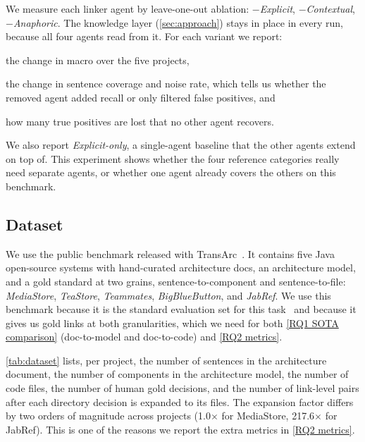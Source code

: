We measure each linker agent by leave-one-out ablation: \emph{$-$Explicit},
\emph{$-$Contextual}, \emph{$-$Anaphoric}. 
The knowledge layer (\autoref{sec:approach}) stays in place in every run, because all four
agents read from it. 
For each variant we report:
\begin{enumerate*}[label=(\roman*)] \item the change in macro \fone over the
five projects, \item the change in sentence coverage and noise rate, which tells
us whether the removed agent added recall or only filtered false positives, and
\item how many true positives are lost that no other agent recovers.
\end{enumerate*} We also report \emph{Explicit-only}, a single-agent baseline
that the other agents extend on top of. This experiment shows whether the four
reference categories really need separate agents, or whether one agent already
covers the others on this benchmark.

\subsection{Dataset}
\label{sec:dataset}

We use the public benchmark released with TransArc~\cite{transarc,replication}.
It contains five Java open-source systems with hand-curated architecture docs, an architecture model, and a gold standard at two grains, sentence-to-component and sentence-to-file:
\emph{MediaStore}, \emph{TeaStore}, \emph{Teammates}, \emph{BigBlueButton}, and \emph{JabRef}.
We use this benchmark because it is the standard evaluation set for this task~\cite{transarc,lissa} and because it gives us gold links at both granularities, which we need for both \ref{RQ1 SOTA comparison} (doc-to-model and doc-to-code) and \ref{RQ2 metrics}.



\autoref{tab:dataset} lists, per project, the number of sentences in the architecture document, the number of components in the architecture model, the number of code files, the number of human gold decisions, and the number of link-level pairs after each directory decision is expanded to its files.
The expansion factor differs by two orders of magnitude across projects (1.0$\times$ for MediaStore, 217.6$\times$ for JabRef).
This is one of the reasons we report the extra metrics in \ref{RQ2 metrics}.

